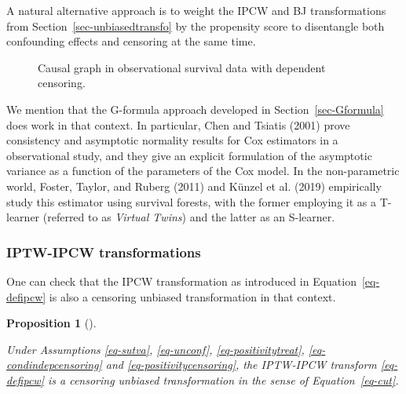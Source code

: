\documentclass[
  11pt,
  a4paper,
]{article}
\theoremstyle{plain}
\theoremstyle{plain}
\theoremstyle{plain}
\newtheorem{proposition}{Proposition}[section]
\theoremstyle{definition}
\theoremstyle{remark}
\begin{document}
A natural alternative approach is to weight the IPCW and BJ
transformations from Section~\ref{sec-unbiasedtransfo} by the propensity
score to disentangle both confounding effects and censoring at the same
time.

\begin{figure}


\caption{\label{fig-causalgraph_obs_dep}Causal graph in observational
survival data with dependent censoring.}

\end{figure}%

We mention that the G-formula approach developed in
Section~\ref{sec-Gformula} does work in that context. In particular,
Chen and Tsiatis (2001) prove consistency and asymptotic normality
results for Cox estimators in a observational study, and they give an
explicit formulation of the asymptotic variance as a function of the
parameters of the Cox model. In the non-parametric world, Foster,
Taylor, and Ruberg (2011) and Künzel et al. (2019) empirically study
this estimator using survival forests, with the former employing it as a
T-learner (referred to as \emph{Virtual Twins}) and the latter as an
S-learner.

\subsubsection{IPTW-IPCW
transformations}\label{iptw-ipcw-transformations}

One can check that the IPCW transformation as introduced in
Equation~\ref{eq-defipcw} is also a censoring unbiased transformation in
that context.

\begin{proposition}[]\protect\hypertarget{prp-iptwipcw}{}\label{prp-iptwipcw}

Under Assumptions
\ref{eq-sutva}, \ref{eq-unconf}, \ref{eq-positivitytreat}, \ref{eq-condindepcensoring}
and \ref{eq-positivitycensoring}, the IPTW-IPCW transform
\ref{eq-defipcw} is a censoring unbiased transformation in the sense of
Equation~\ref{eq-cut}.

\end{proposition}
\end{document}
